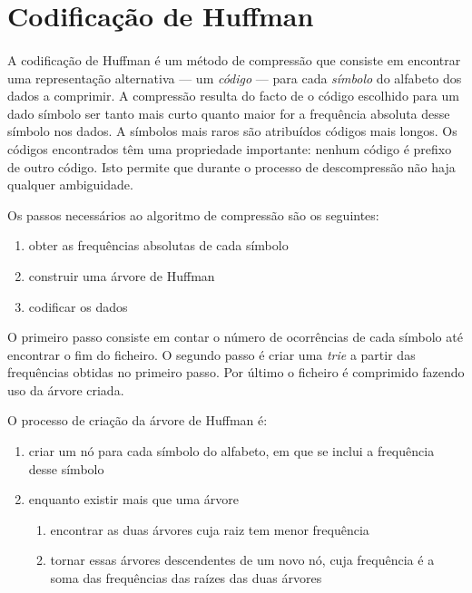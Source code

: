 \documentclass[a4paper]{article}
\begin{document}
	\section{Codificação de Huffman}
	\label{sec:theory}

	\paragraph{} A codificação de Huffman é um método de compressão que consiste em encontrar uma representação alternativa --- um \emph{código} --- para cada \emph{símbolo} do alfabeto dos dados a comprimir. A compressão resulta do facto de o código escolhido para um dado símbolo ser tanto mais curto quanto maior for a frequência absoluta desse símbolo nos dados. A símbolos mais raros são atribuídos códigos mais longos. Os códigos encontrados têm uma propriedade importante: nenhum código é prefixo de outro código. Isto permite que durante o processo de descompressão não haja qualquer ambiguidade.

	Os passos necessários ao algoritmo de compressão são os seguintes:

	\begin{enumerate}
	\item obter as frequências absolutas de cada símbolo
	\item construir uma árvore de Huffman
	\item codificar os dados
	\end{enumerate}

	O primeiro passo consiste em contar o número de ocorrências de cada símbolo até encontrar o fim do ficheiro. O segundo passo é criar uma \emph{trie} a partir das frequências obtidas no primeiro passo. Por último o ficheiro é comprimido fazendo uso da árvore criada.

	O processo de criação da árvore de Huffman é:

	\begin{enumerate}
	\item criar um nó para cada símbolo do alfabeto, em que se inclui a frequência desse símbolo
	\item enquanto existir mais que uma árvore
		\begin{enumerate}
		\item encontrar as duas árvores cuja raiz tem menor frequência
		\item tornar essas árvores descendentes de um novo nó, cuja frequência é a soma das frequências das raízes das duas árvores
		\end{enumerate}
	\end{enumerate}
\end{document}
